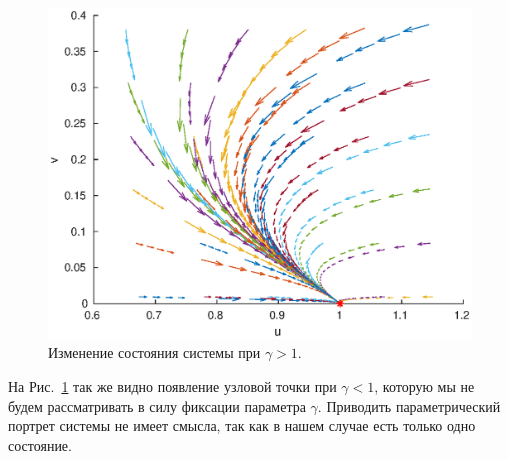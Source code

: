 \begin{figure}[h] 
        \centering
        \includegraphics[width=0.8\linewidth]{continuous_system/stability_of_fixed_points/r1-5.eps}
        \caption{Изменение состояния системы при $\gamma > 1$.}
        \label{img:bifurcation}
\end{figure}

На Рис.~\ref{img:bifurcation} так же видно появление узловой точки при $\gamma < 1$, которую мы не будем рассматривать в силу фиксации параметра $\gamma$. Приводить параметрический портрет системы не  имеет смысла, так как в нашем случае есть только одно состояние. 